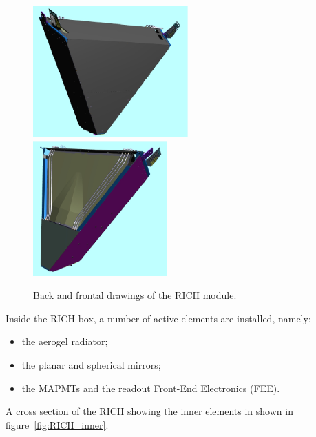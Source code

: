 \documentclass[12pt]{article}
\begin{document}
\begin{figure}[h!]
\center
\includegraphics[width=0.53\textwidth]{Rich_frontal.jpg}
\includegraphics[width=0.46\textwidth]{Rich_back.jpg}
\caption{ \label{fig:RICH_outer} Back and frontal drawings of the RICH module.}
\end{figure}

Inside the RICH box, a number of active elements are installed, namely:
\begin{itemize}
\item{the aerogel radiator;}
\item{the planar and spherical mirrors;}
\item{the MAPMTs and the readout Front-End Electronics (FEE).}
\end{itemize}

A cross section of the RICH showing the inner elements in shown in figure~\ref{fig:RICH_inner}.
\end{document}
